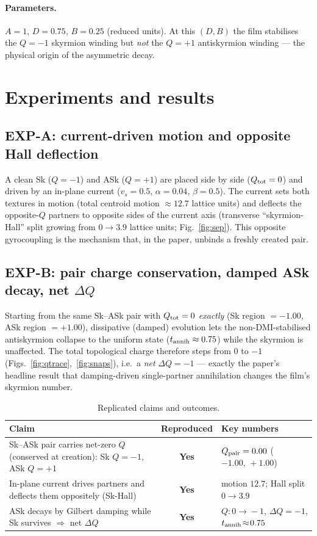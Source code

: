 \documentclass[11pt]{article}
\begin{document}
\paragraph{Parameters.} $A=1$, $D=0.75$, $B=0.25$ (reduced units). At this
$(D,B)$ the film stabilises the $Q=-1$ skyrmion winding but \emph{not} the
$Q=+1$ antiskyrmion winding --- the physical origin of the asymmetric decay.

\section{Experiments and results}

\subsection*{EXP-A: current-driven motion and opposite Hall deflection}
A clean Sk ($Q=-1$) and ASk ($Q=+1$) are placed side by side ($Q_{\rm
tot}=0$) and driven by an in-plane current ($v_s=0.5$, $\alpha=0.04$,
$\beta=0.5$). The current sets both textures in motion (total centroid motion
$\approx12.7$ lattice units) and deflects the opposite-$Q$ partners to opposite
sides of the current axis (transverse ``skyrmion-Hall'' split growing from
$0\to3.9$ lattice units; Fig.~\ref{fig:sep}). This opposite gyrocoupling is the
mechanism that, in the paper, unbinds a freshly created pair.

\subsection*{EXP-B: pair charge conservation, damped ASk decay, net $\Delta Q$}
Starting from the same Sk--ASk pair with $Q_{\rm tot}=0$ \emph{exactly}
(Sk region $=-1.00$, ASk region $=+1.00$), dissipative (damped) evolution lets
the non-DMI-stabilised antiskyrmion collapse to the uniform state
($t_{\rm annih}\approx0.75$) while the skyrmion is unaffected. The total
topological charge therefore steps from $0$ to $-1$
(Figs.~\ref{fig:qtrace},~\ref{fig:snaps}), i.e.\ a \emph{net}
$\Delta Q=-1$ --- exactly the paper's headline result that damping-driven
single-partner annihilation changes the film's skyrmion number.

\begin{table}[h]
\centering
\caption{Replicated claims and outcomes.}
\begin{tabular}{p{7.7cm} c p{4.4cm}}
\toprule
Claim & Reproduced & Key numbers \\
\midrule
Sk--ASk pair carries net-zero $Q$ (conserved at creation): Sk $Q{=}{-}1$,
 ASk $Q{=}{+}1$ & \textbf{Yes} & $Q_{\rm pair}=0.00$ ($-1.00,\,+1.00$) \\
In-plane current drives partners and deflects them oppositely (Sk-Hall) &
 \textbf{Yes} & motion $12.7$; Hall split $0\!\to\!3.9$ \\
ASk decays by Gilbert damping while Sk survives $\Rightarrow$ net $\Delta Q$ &
 \textbf{Yes} & $Q:0\!\to\!-1$, $\Delta Q=-1$, $t_{\rm annih}\!\approx\!0.75$\\
\bottomrule
\end{tabular}
\end{table}
\end{document}
